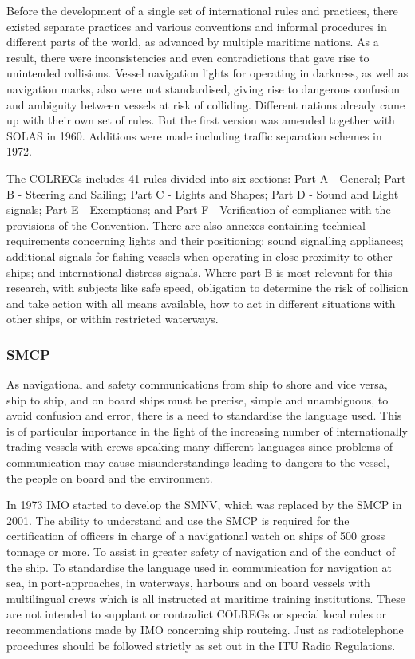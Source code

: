 Before the development of a single set of international rules and practices, there existed separate practices and various conventions and informal procedures in different parts of the world, as advanced by multiple maritime nations. As a result, there were inconsistencies and even contradictions that gave rise to unintended collisions. Vessel navigation lights for operating in darkness, as well as navigation marks, also were not standardised, giving rise to dangerous confusion and ambiguity between vessels at risk of colliding. Different nations already came up with their own set of rules. But the first version was amended together with \ac{SOLAS} in 1960. Additions were made including traffic separation schemes in 1972.

The \ac{COLREGs} includes 41 rules divided into six sections: Part A - General; Part B - Steering and Sailing; Part C - Lights and Shapes; Part D - Sound and Light signals;  Part E - Exemptions; and Part F - Verification of compliance with the provisions of the Convention. There are also annexes containing technical requirements concerning lights and their positioning; sound signalling appliances; additional signals for fishing vessels when operating in close proximity to other ships; and international distress signals.
Where part B is most relevant for this research, with subjects like safe speed, obligation to determine the risk of collision and take action with all means available, how to act in different situations with other ships, or within restricted waterways. 

\subsubsection{\acf{SMCP}}
As navigational and safety communications from ship to shore and vice versa, ship to ship, and on board ships must be precise, simple and unambiguous, to avoid confusion and error, there is a need to standardise the language used. This is of particular importance in the light of the increasing number of internationally trading vessels with crews speaking many different languages since problems of communication may cause misunderstandings leading to dangers to the vessel, the people on board and the environment.

In 1973 \ac{IMO} started to develop the \acf{SMNV}, which was replaced by the \ac{SMCP} in 2001. The ability to understand and use the \ac{SMCP} is required for the certification of officers in charge of a navigational watch on ships of 500 gross tonnage or more. To assist in greater safety of navigation and of the conduct of the ship. To standardise the language used in communication for navigation at sea, in port-approaches, in waterways, harbours and on board vessels with multilingual crews which is all instructed at maritime training institutions. These are not intended to supplant or contradict \ac{COLREGs} or special local rules or recommendations made by IMO concerning ship routeing. Just as radiotelephone procedures should be followed strictly as set out in the ITU Radio Regulations. 

